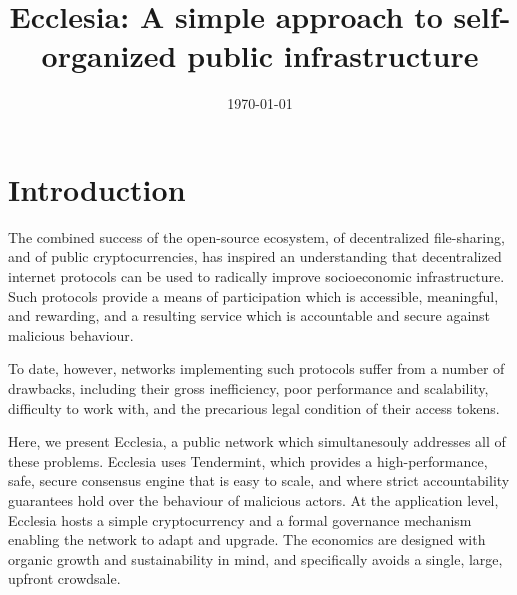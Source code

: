 \documentclass[12pt]{article}
\begin{document}
\begin{algorithm}[H]
\end{algorithm}


\title{
	{Ecclesia: A simple approach to self-organized public infrastructure}
}

\author{}
\date{\today}

\maketitle

\section{Introduction}

The combined success of the open-source ecosystem, of decentralized file-sharing, and of public cryptocurrencies,
has inspired an understanding that decentralized internet protocols 
can be used to radically improve socioeconomic infrastructure.
Such protocols provide a means of participation which is accessible, meaningful, and rewarding,
and a resulting service which is accountable and secure against malicious behaviour.

To date, however, networks implementing such protocols suffer from a number of drawbacks,
including their gross inefficiency, poor performance and scalability, difficulty to work with,
and the precarious legal condition of their access tokens.

Here, we present Ecclesia, a public network which simultanesouly addresses all of these problems.
Ecclesia uses Tendermint, which provides a high-performance, safe, secure consensus engine that is easy to scale, 
and where strict accountability guarantees hold over the behaviour of malicious actors.
At the application level, Ecclesia hosts a simple cryptocurrency and a formal governance mechanism enabling
the network to adapt and upgrade. 
The economics are designed with organic growth and sustainability in mind, 
and specifically avoids a single, large, upfront crowdsale.
\end{document}
